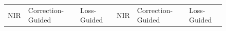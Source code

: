 \begin{figure}[htp!]
    \centering
    \begin{tabularx}{\textwidth}{>{\centering\arraybackslash}X >{\centering\arraybackslash}X >{\centering\arraybackslash}X >{\centering\arraybackslash}X >{\centering\arraybackslash}X >{\centering\arraybackslash}X}
        \centering NIR                                                                                            & Correction-Guided                                                                                                                 & Loss-Guided                                                                                                                 & NIR                                                                                                       & Correction-Guided                                                                                                                 & Loss-Guided                                                                                                                 \\

\end{tabularx}
\end{figure}
